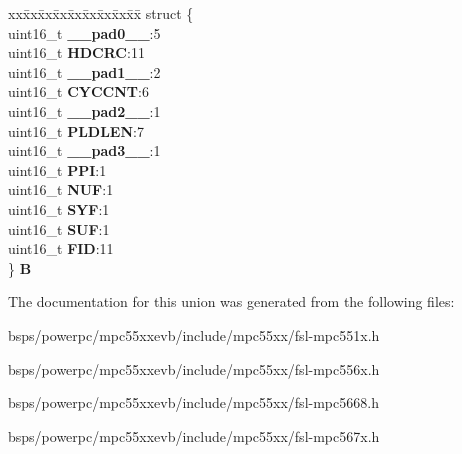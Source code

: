 \begin{DoxyCompactItemize}
\begin{tabbing}
\end{tabbing}\item 
\mbox{\label{unionuF__HEADER_adc54d5631f784e06dc2e9b57f113e0f6}} 
\begin{tabbing}
xx\=xx\=xx\=xx\=xx\=xx\=xx\=xx\=xx\=\kill
struct \{\\
\>uint16\_t {\bfseries \_\_pad0\_\_}:5\\
\>uint16\_t {\bfseries HDCRC}:11\\
\>uint16\_t {\bfseries \_\_pad1\_\_}:2\\
\>uint16\_t {\bfseries CYCCNT}:6\\
\>uint16\_t {\bfseries \_\_pad2\_\_}:1\\
\>uint16\_t {\bfseries PLDLEN}:7\\
\>uint16\_t {\bfseries \_\_pad3\_\_}:1\\
\>uint16\_t {\bfseries PPI}:1\\
\>uint16\_t {\bfseries NUF}:1\\
\>uint16\_t {\bfseries SYF}:1\\
\>uint16\_t {\bfseries SUF}:1\\
\>uint16\_t {\bfseries FID}:11\\
\} {\bfseries B}\\

\end{tabbing}\end{DoxyCompactItemize}


The documentation for this union was generated from the following files\+:\begin{DoxyCompactItemize}
\item 
bsps/powerpc/mpc55xxevb/include/mpc55xx/fsl-\/mpc551x.\+h\item 
bsps/powerpc/mpc55xxevb/include/mpc55xx/fsl-\/mpc556x.\+h\item 
bsps/powerpc/mpc55xxevb/include/mpc55xx/fsl-\/mpc5668.\+h\item 
bsps/powerpc/mpc55xxevb/include/mpc55xx/fsl-\/mpc567x.\+h\end{DoxyCompactItemize}
